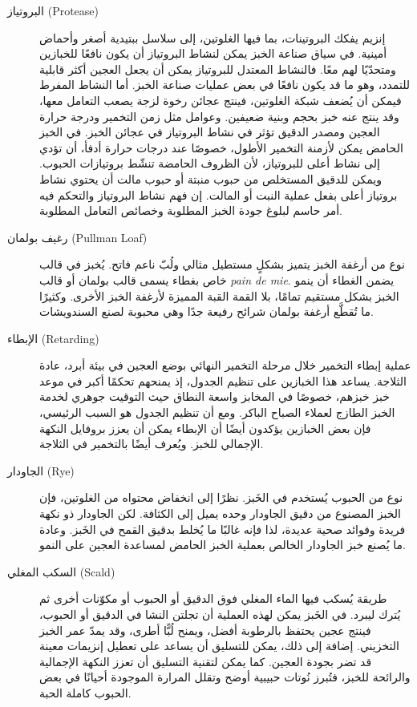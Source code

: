 \begin{description}
\item[البروتياز \textenglish{(Protease)}]
إنزيم يفكك البروتينات، بما فيها الغلوتين، إلى سلاسل ببتيدية أصغر وأحماض أمينية. في سياق صناعة الخبز يمكن لنشاط البروتياز أن يكون نافعًا للخبازين ومتحدّيًا لهم معًا. فالنشاط المعتدل للبروتياز يمكن أن يجعل العجين أكثر قابلية للتمدد، وهو ما قد يكون نافعًا في بعض عمليات صناعة الخبز. أما النشاط المفرط فيمكن أن يُضعف شبكة الغلوتين، فينتج عجائن رخوة لزجة يصعب التعامل معها، وقد ينتج عنه خبز بحجم وبنية ضعيفين. وعوامل مثل زمن التخمير ودرجة حرارة العجين ومصدر الدقيق تؤثر في نشاط البروتياز في عجائن الخبز. في الخبز الحامض يمكن لأزمنة التخمير الأطول، خصوصًا عند درجات حرارة أدفأ، أن تؤدي إلى نشاط أعلى للبروتياز، لأن الظروف الحامضة تنشّط بروتيازات الحبوب. ويمكن للدقيق المستخلص من حبوب منبتة أو حبوب مالت أن يحتوي نشاط بروتياز أعلى بفعل عملية النبت أو المالت. إن فهم نشاط البروتياز والتحكم فيه أمر حاسم لبلوغ جودة الخبز المطلوبة وخصائص التعامل المطلوبة.

\item[رغيف بولمان \textenglish{(Pullman Loaf)}]
نوع من أرغفة الخبز يتميز بشكلٍ مستطيل مثالي ولُبّ ناعم فاتح. يُخبز في قالب خاص بغطاء يسمى قالب بولمان أو قالب \textenglish{\emph{pain de mie}}. يضمن الغطاء أن ينمو الخبز بشكل مستقيم تمامًا، بلا القمة القبة المميزة لأرغفة الخبز الأخرى. وكثيرًا ما تُقطَّع أرغفة بولمان شرائح رفيعة جدًا وهي محبوبة لصنع السندويشات.

\item[الإبطاء \textenglish{(Retarding)}]
عملية إبطاء التخمير خلال مرحلة التخمير النهائي بوضع العجين في بيئة أبرد، عادة الثلاجة. يساعد هذا الخبازين على تنظيم الجدول، إذ يمنحهم تحكمًا أكبر في موعد خبز خبزهم، خصوصًا في المخابز واسعة النطاق حيث التوقيت جوهري لخدمة الخبز الطازج لعملاء الصباح الباكر. ومع أن تنظيم الجدول هو السبب الرئيسي، فإن بعض الخبازين يؤكدون أيضًا أن الإبطاء يمكن أن يعزز بروفايل النكهة الإجمالي للخبز. ويُعرف أيضًا بالتخمير في الثلاجة.

\item[الجاودار \textenglish{(Rye)}]
نوع من الحبوب يُستخدم في الخَبز. نظرًا إلى انخفاض محتواه من الغلوتين، فإن الخبز المصنوع من دقيق الجاودار وحده يميل إلى الكثافة. لكن الجاودار ذو نكهة فريدة وفوائد صحية عديدة، لذا فإنه غالبًا ما يُخلط بدقيق القمح في الخَبز. وعادة ما يُصنع خبز الجاودار الخالص بعملية الخبز الحامض لمساعدة العجين على النمو.

\item[السكب المغلي \textenglish{(Scald)}]
طريقة يُسكب فيها الماء المغلي فوق الدقيق أو الحبوب أو مكوّنات أخرى ثم يُترك ليبرد. في الخَبز يمكن لهذه العملية أن تجلتن النشا في الدقيق أو الحبوب، فينتج عجين يحتفظ بالرطوبة أفضل، ويمنح لُبًّا أطرى، وقد يمدّ عمر الخبز التخزيني. إضافة إلى ذلك، يمكن للتسليق أن يساعد على تعطيل إنزيمات معينة قد تضر بجودة العجين. كما يمكن لتقنية التسليق أن تعزز النكهة الإجمالية والرائحة للخبز، فتُبرز نُوتات حبيبية أوضح وتقلل المرارة الموجودة أحيانًا في بعض الحبوب كاملة الحبة.


\end{description}
